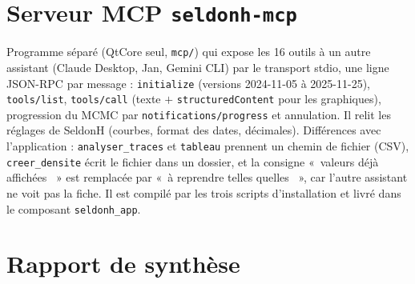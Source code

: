 \documentclass[11pt,a4paper]{article}
\providecommand{\og}{«~}\providecommand{\fg}{\unskip~»}
\newcommand{\code}[1]{\texttt{\small #1}}
\begin{document}
\section{Serveur MCP \code{seldonh-mcp}}
Programme séparé (QtCore seul, \code{mcp/}) qui expose les 16 outils à un autre assistant (Claude Desktop, Jan,
Gemini CLI) par le transport stdio, une ligne JSON-RPC par message : \code{initialize} (versions 2024-11-05 à
2025-11-25), \code{tools/list}, \code{tools/call} (texte $+$ \code{structuredContent} pour les graphiques), progression
du MCMC par \code{notifications/progress} et annulation. Il relit les réglages de SeldonH (courbes, format des dates,
décimales). Différences avec l'application : \code{analyser\_traces} et \code{tableau} prennent un chemin de fichier
(CSV), \code{creer\_densite} écrit le fichier dans un dossier, et la consigne \og valeurs déjà affichées \fg{} est
remplacée par \og à reprendre telles quelles \fg, car l'autre assistant ne voit pas la fiche. Il est compilé par les
trois scripts d'installation et livré dans le composant \code{seldonh\_app}.

\section{Rapport de synthèse}\label{sec:rapport}
\end{document}
